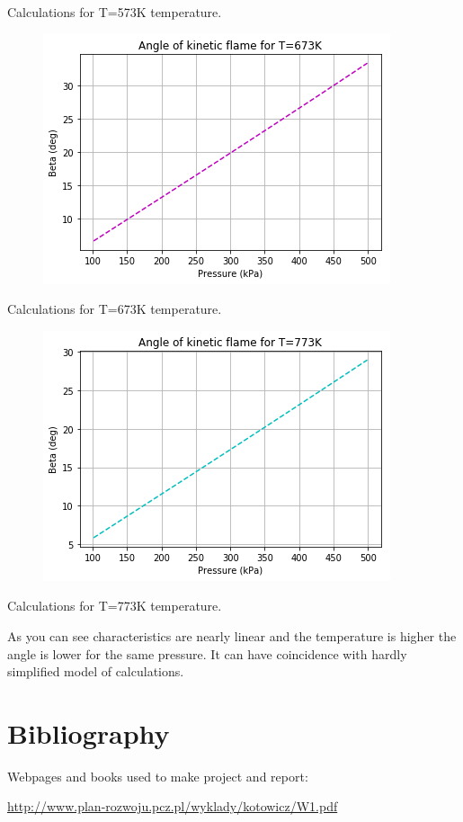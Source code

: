 \documentclass[a4paper]{article}
\begin{document}
Calculations for T=573K temperature.
\begin{figure}[!h]
\centering
\includegraphics[scale=0.5]{5.png}
\end{figure}

Calculations for T=673K temperature.
\begin{figure}[!h]
\centering
\includegraphics[scale=0.5]{6.png}
\end{figure}

Calculations for T=773K temperature.

As you can see characteristics are nearly linear and the temperature is higher the angle is lower for the same pressure. It can have coincidence with hardly simplified model of calculations.

\section{Bibliography}

Webpages and books used to make project and report:

\url{http://www.plan-rozwoju.pcz.pl/wyklady/kotowicz/W1.pdf}
\end{document}
